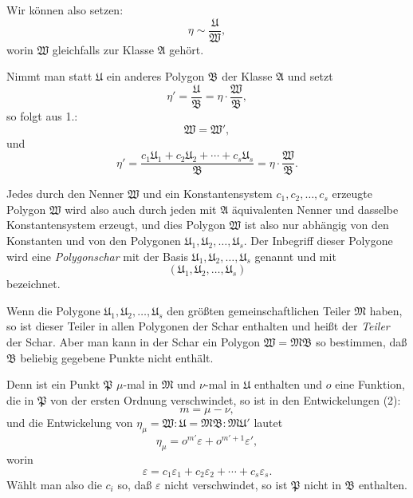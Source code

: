 \documentclass[12pt,a4paper]{article}
\begin{document}
Wir können also setzen:
\begin{equation}\label{eq:192-5}
\eta \sim \frac{\mathfrak{U}}{\mathfrak{W}},
\end{equation}
worin $\mathfrak{W}$ gleichfalls zur Klasse $\mathfrak{A}$ gehört.

Nimmt man statt $\mathfrak{U}$ ein anderes Polygon $\mathfrak{B}$ der Klasse $\mathfrak{A}$ und setzt
\begin{equation}\label{eq:192-6}
\eta' = \frac{\mathfrak{U}}{\mathfrak{B}} = \eta \cdot \frac{\mathfrak{W}}{\mathfrak{B}},
\end{equation}
so folgt aus 1.:
\begin{equation}\label{eq:192-7}
\mathfrak{W} = \mathfrak{W}',
\end{equation}
und
\begin{equation}\label{eq:192-8}
\eta' = \frac{c_1\mathfrak{U}_1 + c_2\mathfrak{U}_2 + \cdots + c_s\mathfrak{U}_s}{\mathfrak{B}} = \eta \cdot \frac{\mathfrak{W}}{\mathfrak{B}}.
\end{equation}

Jedes durch den Nenner $\mathfrak{W}$ und ein Konstantensystem $c_1, c_2, \ldots, c_s$ erzeugte Polygon $\mathfrak{W}$ wird also auch durch jeden mit $\mathfrak{A}$ äquivalenten Nenner und dasselbe Konstantensystem erzeugt, und dies Polygon $\mathfrak{W}$ ist also nur abhängig von den Konstanten und von den Polygonen $\mathfrak{U}_1, \mathfrak{U}_2, \ldots, \mathfrak{U}_s$. Der Inbegriff dieser Polygone wird eine \emph{Polygonschar} mit der Basis $\mathfrak{U}_1, \mathfrak{U}_2, \ldots, \mathfrak{U}_s$ genannt und mit
\begin{equation}\label{eq:192-9}
(\mathfrak{U}_1, \mathfrak{U}_2, \ldots, \mathfrak{U}_s)
\end{equation}
bezeichnet.

Wenn die Polygone $\mathfrak{U}_1, \mathfrak{U}_2, \ldots, \mathfrak{U}_s$ den größten gemeinschaftlichen Teiler $\mathfrak{M}$ haben, so ist dieser Teiler in allen Polygonen der Schar enthalten und heißt der \emph{Teiler} der Schar. Aber man kann in der Schar ein Polygon $\mathfrak{W} = \mathfrak{M}\mathfrak{B}$ so bestimmen, daß $\mathfrak{B}$ beliebig gegebene Punkte nicht enthält.

Denn ist ein Punkt $\mathfrak{P}$ $\mu$-mal in $\mathfrak{M}$ und $\nu$-mal in $\mathfrak{U}$ enthalten und $o$ eine Funktion, die in $\mathfrak{P}$ von der ersten Ordnung verschwindet, so ist in den Entwickelungen (2):
\[
m = \mu - \nu,
\]
und die Entwickelung von $\eta_\mu = \mathfrak{W}:\mathfrak{U} = \mathfrak{M}\mathfrak{B}:\mathfrak{M}\mathfrak{U}'$ lautet
\[
\eta_\mu = o^{m'} \varepsilon + o^{m'+1} \varepsilon',
\]
worin
\[
\varepsilon = c_1\varepsilon_1 + c_2\varepsilon_2 + \cdots + c_s\varepsilon_s.
\]
Wählt man also die $c_i$ so, daß $\varepsilon$ nicht verschwindet, so ist $\mathfrak{P}$ nicht in $\mathfrak{B}$ enthalten.
\end{document}
